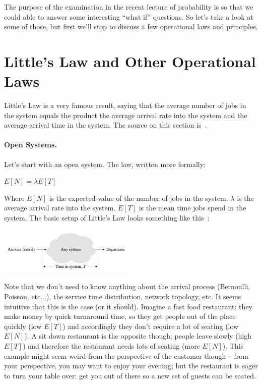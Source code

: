 




The purpose of the examination in the recent lecture of probability is so that we could able to answer some interesting ``what if'' questions. So let's take a look at some of those, but first we'll stop to discuss a few operational laws and principles.

\section*{Little's Law and Other Operational Laws}
Little's Law is a very famous result, saying that the average number of jobs in the system equals the product the average arrival rate into the system and the average arrival time in the system. The source on this section is~\cite{pmd}. 

\paragraph{Open Systems.} Let's start with an open system. The law, written more formally:

\begin{center}
	$E[N] = \lambda E[T]$
\end{center}

Where $E[N]$ is the expected value of the number of jobs in the system. $\lambda$ is the average arrival rate into the system. $E[T]$ is the mean time jobs spend in the system. The basic setup of Little's Law looks something like this~\cite{pmd}:

\begin{center}
	\includegraphics[width=0.5\textwidth]{images/littleslaw.png}
\end{center}

Note that we don't need to know anything about the arrival process (Bernoulli, Poisson, etc...), the service time distribution, network topology, etc. It seems intuitive that this is the case (or it should). Imagine a fast food restaurant: they make money by quick turnaround time, so they get people out of the place quickly (low $E[T]$) and accordingly they don't require a lot of seating (low $E[N]$). A sit down restaurant is the opposite though; people leave slowly (high $E[T]$) and therefore the restaurant needs lots of seating (more $E[N]$). This example might seem weird from the perspective of the customer though -- from your perspective, you may want to enjoy your evening; but the restaurant is eager to turn your table over: get you out of there so a new set of guests can be seated.


